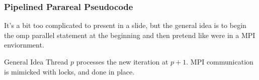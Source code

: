 \documentclass[pdf,12pt]{beamer}
\begin{document}
\begin{frame}
  \frametitle{Pipelined Parareal Pseudocode}
  It's a bit too complicated to present in a slide, but the general idea is to
  begin the omp parallel statement at the beginning and then pretend like were
  in a MPI enviornment.
  \begin{block}{General Idea}
    Thread $p$ processes the new iteration at $p+1$. MPI communication is
    mimicked with locks, and done in place.
  \end{block}
\end{frame}
\end{document}
